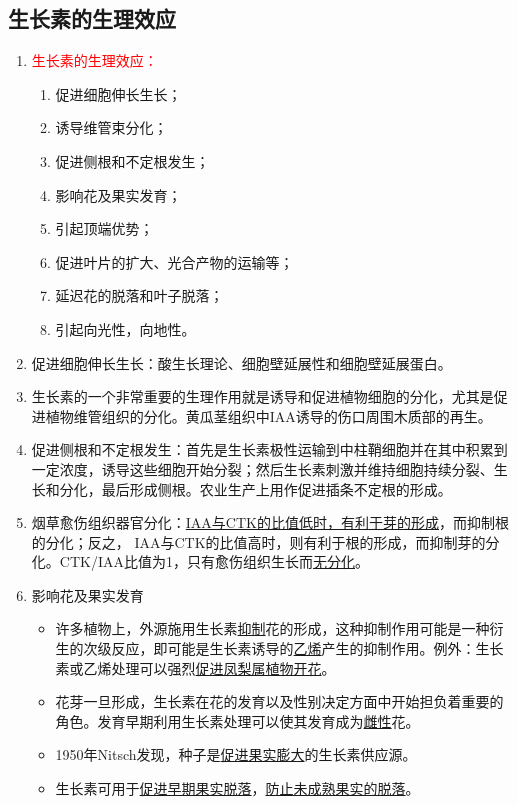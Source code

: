 \subsection{生长素的生理效应}
\begin{enumerate}
    \item \textcolor{red}{生长素的生理效应：}
    \begin{enumerate}
        \item 促进细胞伸长生长；
        \item 诱导维管束分化；
        \item 促进侧根和不定根发生；
        \item 影响花及果实发育；
        \item 引起顶端优势；
        \item 促进叶片的扩大、光合产物的运输等；
        \item 延迟花的脱落和叶子脱落；
        \item 引起向光性，向地性。
    \end{enumerate}
    \item 促进细胞伸长生长：酸生长理论、细胞壁延展性和细胞壁延展蛋白。
    \item 生长素的一个非常重要的生理作用就是诱导和促进植物细胞的分化，尤其是促进植物维管组织的分化。黄瓜茎组织中IAA诱导的伤口周围木质部的再生。
    \item 促进侧根和不定根发生：首先是生长素极性运输到中柱鞘细胞并在其中积累到一定浓度，诱导这些细胞开始分裂；然后生长素刺激并维持细胞持续分裂、生长和分化，最后形成侧根。农业生产上用作促进插条不定根的形成。
    \item 烟草愈伤组织器官分化：\uline{IAA与CTK的比值低时，有利于芽的形成}，而抑制根的分化；反之， IAA与CTK的比值高时，则有利于根的形成，而抑制芽的分化。CTK/IAA比值为1，只有愈伤组织生长而\uline{无分化}。
    \item 影响花及果实发育
    \begin{itemize}
        \item 许多植物上，外源施用生长素\uline{抑制}花的形成，这种抑制作用可能是一种衍生的次级反应，即可能是生长素诱导的\uline{乙烯}产生的抑制作用。例外：生长素或乙烯处理可以强烈\uline{促进凤梨属植物开花}。
        \item 花芽一旦形成，生长素在花的发育以及性别决定方面中开始担负着重要的角色。发育早期利用生长素处理可以使其发育成为\uline{雌性}花。
        \item 1950年Nitsch发现，种子是\uline{促进果实膨大}的生长素供应源。
        \item 生长素可用于\uline{促进早期果实脱落}，\uline{防止未成熟果实的脱落}。
    \end{itemize}
\end{enumerate}

